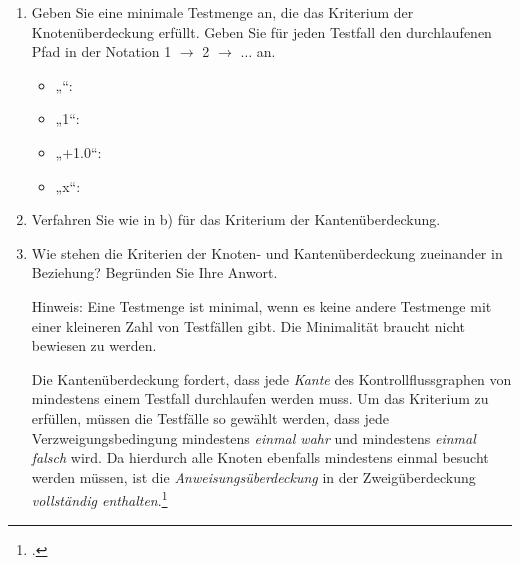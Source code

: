 \documentclass{bschlangaul-aufgabe}
\begin{document}
\begin{enumerate}

\item Geben Sie eine minimale Testmenge an, die das Kriterium der
Knotenüberdeckung erfüllt. Geben Sie für jeden Testfall den
durchlaufenen Pfad in der Notation 1 $\rightarrow$ 2 $\rightarrow$
$\dots$ an.

\begin{bAntwort}
\begin{itemize}
\item „“: \\

\item „1“:\\

\item „+1.0“:\\

\item „x“:\\
\end{itemize}
\end{bAntwort}


\item Verfahren Sie wie in b) für das Kriterium der Kantenüberdeckung.

\begin{bAntwort}
\bMetaNochKeineLoesung
\end{bAntwort}


\item Wie stehen die Kriterien der Knoten- und Kantenüberdeckung
zueinander in Beziehung? Begründen Sie Ihre Anwort.

Hinweis: Eine Testmenge ist minimal, wenn es keine andere Testmenge mit
einer kleineren Zahl von Testfällen gibt. Die Minimalität braucht nicht
bewiesen zu werden.

\begin{bAntwort}
Die Kantenüberdeckung fordert, dass jede \emph{Kante} des
Kontrollflussgraphen von mindestens einem Testfall durchlaufen werden
muss. Um das Kriterium zu erfüllen, müssen die Testfälle so gewählt
werden, dass jede Verzweigungsbedingung mindestens \emph{einmal wahr}
und mindestens \emph{einmal falsch} wird. Da hierdurch alle Knoten
ebenfalls mindestens einmal besucht werden müssen, ist die
\emph{Anweisungsüberdeckung} in der Zweigüberdeckung \emph{vollständig
enthalten}.\footcite[Seite 209]{hoffmann:software}
\end{bAntwort}

\end{enumerate}
\end{document}
